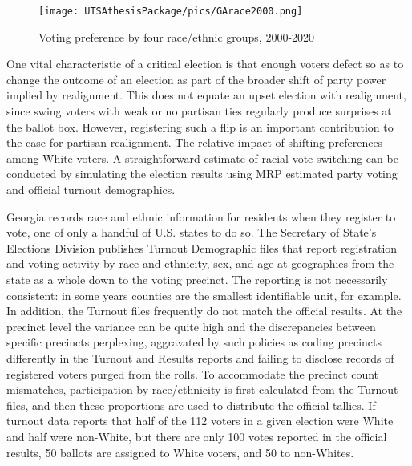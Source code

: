 \begin{figure}[ht]
\centering
\texttt{[image: UTSAthesisPackage/pics/GArace2000.png]}
\caption{Voting preference by four race/ethnic groups, 2000-2020}
\label{fig:ga-race}
\end{figure}


One vital characteristic of a critical election is that enough voters defect so as to change the outcome of an election as part of the broader shift of party power implied by realignment. This does not equate an upset election with realignment, since swing voters with weak or no partisan ties regularly produce surprises at the ballot box. However, registering such a flip is an important contribution to the case for partisan realignment. The relative impact of shifting preferences among White voters. A straightforward estimate of racial vote switching can be conducted by simulating the election results using MRP estimated party voting and official turnout demographics.

Georgia records race and ethnic information for residents when they register to vote, one of only a handful of U.S. states to do so. The Secretary of State's Elections Division publishes Turnout Demographic files that report registration and voting activity by race and ethnicity, sex, and age at geographies from the state as a whole down to the voting precinct. The reporting is not necessarily consistent: in some years counties are the smallest identifiable unit, for example. In addition, the Turnout files frequently do not match the official results. At the precinct level the variance can be quite high and the discrepancies between specific precincts perplexing, aggravated by such policies as coding precincts differently in the Turnout and Results reports and failing to disclose records of registered voters purged from the rolls. To accommodate the precinct count mismatches, participation by race/ethnicity is first calculated from the Turnout files, and then these proportions are used to distribute the official tallies. If turnout data reports that half of the 112 voters in a given election were White and half were non-White, but there are only 100 votes reported in the official results, 50 ballots are assigned to White voters, and 50 to non-Whites. 

